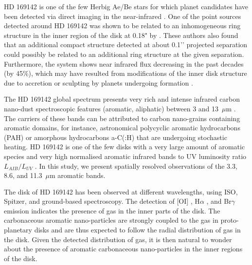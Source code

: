 \documentclass{aa}
\newcommand{\mic}{~$\mu$m\xspace}
\begin{document}
HD 169142 is one of the few Herbig Ae/Be stars for which planet candidates have been detected via direct imaging in the near-infrared \citep{Biller_2014, Reggiani_2014, Osorio_2014, Quanz_2013}. One of the point sources detected around HD 169142 \citep{Biller_2014, Reggiani_2014} was shown to be related to an inhomogeneous ring structure in the inner region of the disk at 0.18" by \citet{Ligi2018}. These authors also found that an additional compact structure detected at about 0.1’’ projected separation could possibly be related to an additional ring structure at the given separation. 
Furthermore, the system shows near infrared flux decreasing in the past decades (by 45\%), which may have resulted from modifications of the inner disk structure 
due to accretion or sculpting by planets undergoing formation \citep{Wagner2015}.  

The HD 169142 global spectrum presents very rich and intense infrared carbon nano-dust spectroscopic features (aromatic, aliphatic) between 3 and 13~$\mu$m \citep{Meeus2001, Sloan2005, Acke2010, Bouteraon_032019, Seok2017}. The carriers of these bands can be attributed to carbon nano-grains containing aromatic domains, for instance,
astronomical polycyclic aromatic hydrocarbons (PAH) or amorphous hydrocarbons a-C(:H) that are
undergoing stochastic heating.
HD 169142 is one of the few disks with a very large amount of aromatic species \citep{Woitke_2016} and very high normalised aromatic infrared bands to UV luminosity ratio $L_{AIB}/L_{UV}$ \citep{Acke2004, Maaskant2014}. 
In this study, we present spatially resolved observations of the 3.3, 8.6, and 11.3\mic aromatic bands. 

The disk of HD 169142 has been observed at different wavelengths, using ISO, Spitzer, and ground-based spectroscopy. 
The detection of [OI] \citep{Acke2005}, H$\alpha$ \citep{Dunkin_1997}, and Br$\gamma$ \citep{GarciaLopez2006} emission indicates the presence of gas in the inner parts of the disk. 
The carbonaceous aromatic nano-particles are strongly coupled to the gas in proto-planetary disks and are thus expected to follow the radial distribution of gas in the disk. Given the detected distribution of gas, it is then natural to wonder about the presence of aromatic carbonaceous nano-particles in the inner regions of the disk.
\end{document}
